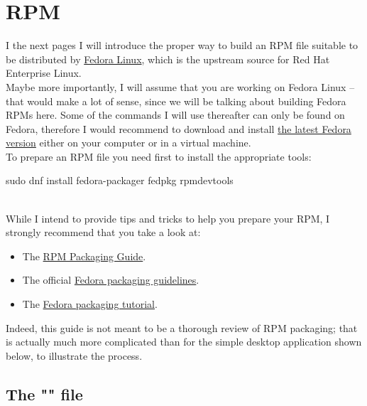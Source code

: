 \section{RPM}

I the next pages I will introduce the proper way to build an RPM file suitable to be distributed by \href{https://www.fedora.org}{Fedora Linux}, 
which is the upstream source for Red Hat Enterprise Linux. \\[0.25cm]
Maybe more importantly, I will assume that you are working on Fedora Linux – 
that would make a lot of sense, since we will be talking about building Fedora RPMs here. 
Some of the commands I will use thereafter can only be found on Fedora, 
therefore I would recommend to download and install \href{https://getfedora.org/fr/workstation/download/}{the latest Fedora version} either on your computer or in a virtual machine. \\[0.5cm]
To prepare an RPM file you need first to install the appropriate tools: 
\begin{script}
\fprompt{~} sudo dnf install fedora-packager fedpkg rpmdevtools
\end{script}
\\[-0.5cm]
\noindent While I intend to provide tips and tricks to help you prepare your RPM, I strongly recommend that you take a look at:
\begin{itemize}
\item The \href{https://rpm-packaging-guide.github.io/}{RPM Packaging Guide}.
\item The official \href{https://docs.fedoraproject.org/en-US/packaging-guidelines/}{Fedora packaging guidelines}. 
\item The \href{https://docs.fedoraproject.org/en-US/packaging-guidelines/}{Fedora packaging tutorial}.
\end{itemize}
Indeed, this guide is not meant to be a thorough review of RPM packaging;  
that is actually much more complicated than for the simple desktop application shown below, to illustrate the process. 

\subsection{The "" file}

